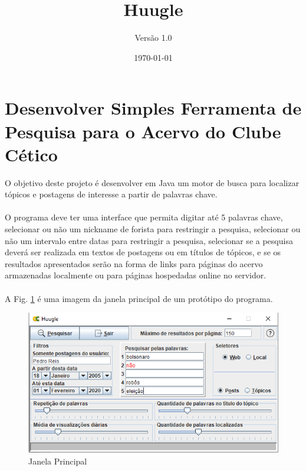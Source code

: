 \documentclass[a4paper,12pt,openany]{book}
\begin{document}
\author{Versão 1.0}
\title{Huugle}
\date{\today}


\maketitle

\renewcommand{\contentsname}{Índice}
\tableofcontents

\newpage

\chapter*{Desenvolver Simples Ferramenta de Pesquisa para o Acervo do Clube Cético}

O objetivo deste projeto é desenvolver em Java um motor de busca para localizar tópicos 
e postagens de interesse a partir de palavras chave.
\\\\
O programa deve ter uma interface que permita digitar até 5 palavras chave, selecionar ou 
não um nickname de forista para restringir a pesquisa, selecionar ou não um intervalo 
entre datas para restringir a pesquisa, selecionar se a pesquisa deverá ser realizada
em textos de postagens ou em títulos de tópicos, e se os resultados apresentados serão
na forma de links para páginas do acervo armazenadas localmente ou para páginas hospedadas 
online no servidor.
\\\\
A Fig. \ref{figura:JanelaPrincipal} é uma imagem da janela principal de um protótipo do programa.

\begin{figure}[h]
	\centering %
	\includegraphics[width=15cm]{Figuras/principal.png} %
	\caption{Janela Principal}
	\label{figura:JanelaPrincipal}
\end{figure}
\end{document}
